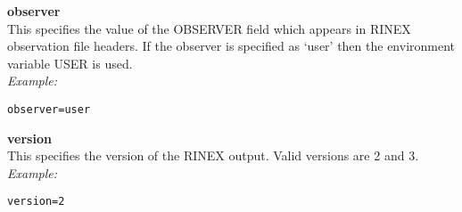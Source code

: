 {\bfseries observer}\\
This specifies the value of the OBSERVER field which appears in RINEX observation file headers.
If the observer is specified as `user' then the environment variable USER is used.\\
\textit{Example:}
\begin{lstlisting}
observer=user
\end{lstlisting}

{\bfseries version}\\
This  specifies the version of the RINEX output. Valid versions are 2 and 3.\\
\textit{Example:}
\begin{lstlisting}
version=2
\end{lstlisting}


